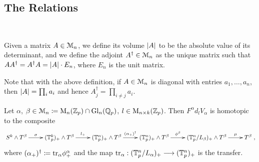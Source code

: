 \subsection{The Relations}
%
\\
\begin{defn}
Given a matrix $A \in \mathcal{M}_n$, we define its volume $\left\vert A\right\vert$ to be the absolute value of its determinant, and we define the adjoint $A^\dagger \in \mathcal{M}_n$ as the unique matrix such that $A A^\dagger = A^\dagger A = \left\vert A\right\vert \cdot E_n$, where $E_n$ is the unit matrix.
\end{defn}
%
%
\begin{rem}
Note that with the above definition, if $A \in \mathcal{M}_n$ is diagonal with entries $a_1, \ldots, a_n$, then $\left\vert A\right\vert = \prod_i a_i$ and hence $A^\dagger_j = \prod_{i \neq j} a_i$.
\end{rem}
%
%
\begin{lem}\cite[Lemma 3.17]{carlsson2011higher}
Let $\alpha$, $\beta \in \mathcal{M}_n \coloneqq \mathrm{M}_n(\mathbb{Z}_p) \cap \operatorname{Gl}_n(\mathbb{Q}_p)$, $l \in \mathrm{M}_{n \times k}(\mathbb{Z}_p)$. Then $F^\alpha d_l V_\alpha$ is homotopic to the composite
$$\begin{xy}
\xymatrix{
  S^k \wedge T^\beta \ar[r]^-{\sigma} &%
  (\sT^k_p)_+ \wedge T^\beta \ar[r]^-{l_+} &%
  (\sT^n_p)_+ \wedge T^\beta \ar[r]^-{(\alpha_+)^\dagger} &%
  (\sT^n_p)_+ \wedge T^\beta \ar[r]^-{\phi^\beta} &%
  (\sT^n_p/L_\beta)_+ \wedge T^\beta \ar[r]^-{\mu} &%
  T^\beta
  }%
\end{xy},$$
where $(\alpha_+)^\dagger \coloneqq \mathrm{tr}_\alpha\phi^\alpha_+$ and the map $\mathrm{tr}_\alpha: (\mathbb{T}^n_p/L_\alpha)_+ \longrightarrow (\mathbb{T}^n_p)_+$ is the transfer.
\end{lem}
%
%
